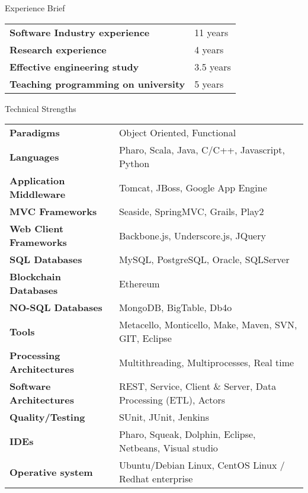 \documentclass{resume} %
\begin{document}
\begin{rSection}{Experience Brief}

\begin{tabular}{ @{} >{\bfseries}l @{\hspace{6ex}} l }

Software Industry experience & 11 years \\
Research experience & 4 years \\
Effective engineering study & 3.5 years \\
Teaching programming on university & 5 years \\

\end{tabular}
\end{rSection}
\begin{rSection}{Technical Strengths}

\begin{tabular}{ @{} >{\bfseries}l @{\hspace{6ex}} l }
Paradigms & Object Oriented, Functional \\
Languages & Pharo, Scala, Java, C/C++, Javascript, Python  \\
Application Middleware & Tomcat, JBoss, Google App Engine \\
MVC Frameworks &  Seaside, SpringMVC, Grails, Play2 \\
Web Client Frameworks & Backbone.js, Underscore.js, JQuery \\
SQL Databases & MySQL, PostgreSQL, Oracle, SQLServer  \\
Blockchain Databases & Ethereum \\
NO-SQL Databases & MongoDB, BigTable, Db4o  \\
Tools & Metacello, Monticello, Make, Maven, SVN, GIT, Eclipse \\
Processing Architectures & Multithreading, Multiprocesses, Real time \\
Software Architectures & REST, Service,  Client \& Server, Data Processing (ETL), Actors\\
Quality/Testing & SUnit, JUnit, Jenkins \\
IDEs & Pharo, Squeak, Dolphin, Eclipse, Netbeans, Visual studio \\
Operative system & Ubuntu/Debian Linux, CentOS Linux / Redhat enterprise \\
\end{tabular}

\end{rSection}
\end{document}
